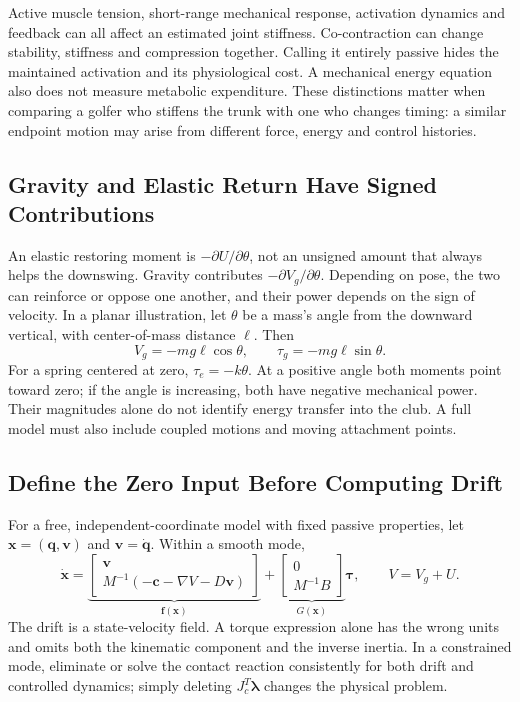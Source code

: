 Active muscle tension, short-range mechanical response, activation dynamics and feedback can all affect an estimated joint stiffness. Co-contraction can change stability, stiffness and compression together. Calling it entirely passive hides the maintained activation and its physiological cost. A mechanical energy equation also does not measure metabolic expenditure. These distinctions matter when comparing a golfer who stiffens the trunk with one who changes timing: a similar endpoint motion may arise from different force, energy and control histories.

\subsection{Gravity and Elastic Return Have Signed Contributions}
An elastic restoring moment is $-\partial U/\partial\theta$, not an unsigned amount that always helps the downswing. Gravity contributes $-\partial V_g/\partial\theta$. Depending on pose, the two can reinforce or oppose one another, and their power depends on the sign of velocity. In a planar illustration, let $\theta$ be a mass's angle from the downward vertical, with center-of-mass distance $\ell$. Then
\begin{equation}
V_g=-mg\ell\cos\theta,\qquad
\tau_g=-mg\ell\sin\theta.
\end{equation}
For a spring centered at zero, $\tau_e=-k\theta$. At a positive angle both moments point toward zero; if the angle is increasing, both have negative mechanical power. Their magnitudes alone do not identify energy transfer into the club. A full model must also include coupled motions and moving attachment points.

\subsection{Define the Zero Input Before Computing Drift}
For a free, independent-coordinate model with fixed passive properties, let $\bm x=(\bm q,\bm v)$ and $\bm v=\dot{\bm q}$. Within a smooth mode,
\begin{equation}
\dot{\bm x}=
\underbrace{\begin{bmatrix}
\bm v\\
M^{-1}(-\bm c-\nabla V-D\bm v)
\end{bmatrix}}_{\bm f(\bm x)}
+\underbrace{\begin{bmatrix}0\\M^{-1}B\end{bmatrix}}_{G(\bm x)}\bm\tau,
\qquad V=V_g+U.
\end{equation}
The drift is a state-velocity field. A torque expression alone has the wrong units and omits both the kinematic component and the inverse inertia. In a constrained mode, eliminate or solve the contact reaction consistently for both drift and controlled dynamics; simply deleting $J_c^T\bm\lambda$ changes the physical problem.

